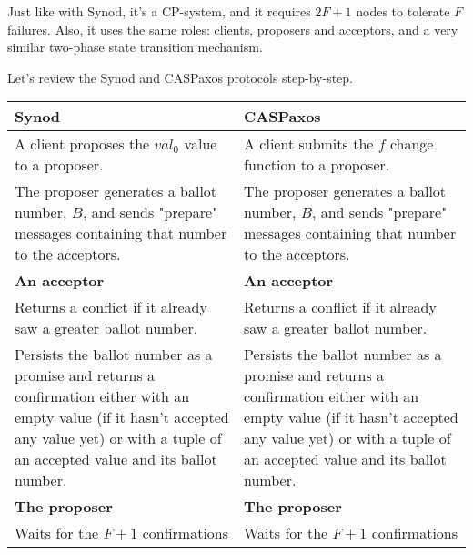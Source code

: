 \documentclass[12pt]{article}
\theoremstyle{definition}
\begin{document}
Just like with Synod, it's a CP-system, and it requires $2F+1$ nodes to tolerate $F$ failures. Also, it uses the same roles: clients, proposers and acceptors, and a very similar two-phase state transition mechanism.

Let's review the Synod and CASPaxos protocols step-by-step.

\begin{center}
\begin{longtable}{p{15em}|p{15em}} 
  \hline
  {\bf Synod}
  &
  {\bf CASPaxos} \\ 
  \hline
  \endfirsthead

  \endhead
  \endfoot
  \endlastfoot
  
  A client proposes the $val_0$ value to a proposer.
  &
  A client submits the $f$ change function to a proposer. \\
  
  \hline
  
  The proposer generates a ballot number, $B$, and sends "prepare" messages containing that number to the acceptors.
  &
  The proposer generates a ballot number, $B$, and sends "prepare" messages containing that number to the acceptors. \\
  
  \hline
  
  {\bf An acceptor}
  &
  {\bf An acceptor} \\[6pt]
  
  
  Returns a conflict if it already saw a greater ballot number.
  &
  Returns a conflict if it already saw a greater ballot number.
  \\[6pt]
  
  
  Persists the ballot number as a promise and returns a confirmation either with an empty value (if it hasn't accepted any value yet) or with a tuple of an accepted value and its ballot number.
  &
  Persists the ballot number as a promise and returns a confirmation either with an empty value (if it hasn't accepted any value yet) or with a tuple of an accepted value and its ballot number.
  \\[6pt]
  
  \hline

  {\bf The proposer}
  &
  {\bf The proposer} \\[6pt]
  

  Waits for the $F+1$ confirmations
  &
  Waits for the $F+1$ confirmations \\[6pt]
  

\end{longtable}
\end{center}
\end{document}
